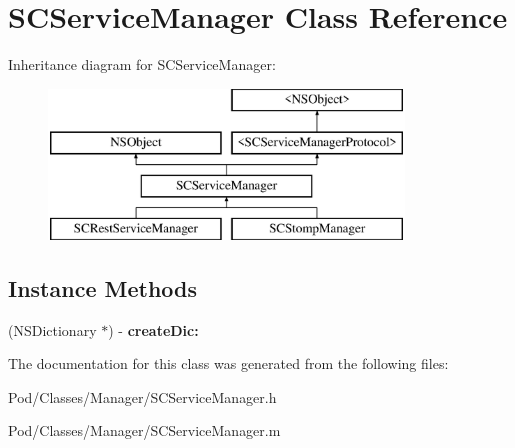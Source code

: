 \hypertarget{interface_s_c_service_manager}{}\section{S\+C\+Service\+Manager Class Reference}
\label{interface_s_c_service_manager}
Inheritance diagram for S\+C\+Service\+Manager\+:\begin{figure}[H]
\begin{center}
\leavevmode
\includegraphics[height=4.000000cm]{interface_s_c_service_manager}
\end{center}
\end{figure}
\subsection*{Instance Methods}
\begin{DoxyCompactItemize}
\item 
(N\+S\+Dictionary $\ast$) -\/ {\bfseries create\+Dic\+:}\hypertarget{interface_s_c_service_manager_a57694e1d3259ce6b1244957fea90943c}{}\label{interface_s_c_service_manager_a57694e1d3259ce6b1244957fea90943c}

\end{DoxyCompactItemize}


The documentation for this class was generated from the following files\+:\begin{DoxyCompactItemize}
\item 
Pod/\+Classes/\+Manager/S\+C\+Service\+Manager.\+h\item 
Pod/\+Classes/\+Manager/S\+C\+Service\+Manager.\+m\end{DoxyCompactItemize}
